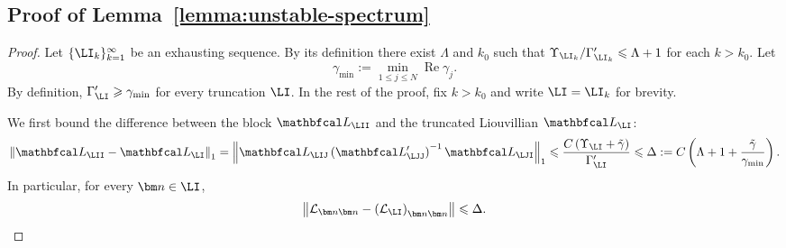 \documentclass{SciPost}
\renewcommand{\Re}{\operatorname{Re}}
\begin{document}
\subsection{Proof of Lemma~\ref{lemma:unstable-spectrum}}
\label{sec:lemma-unstable-spectrum-proof}
\begin{proof}
    Let $\{\LI_k\}_{k=1}^\infty$ be an exhausting sequence. By its definition there exist $\Lambda$ and $k_0$ such that ${\Upsilon_{\LI_k}} / {\Gamma'_{\LI_k}} \leqslant \Lambda + 1$ for each $k > k_0$.
    Let
    \begin{equation}
        \gamma_{\min}
        :=
        \min_{1\leqslant j\leqslant N}\Re \gamma_j.
    \end{equation}
    By definition, \(\Gamma'_\LI \geqslant \gamma_{\min}\) for every truncation \(\LI\).
    In the rest of the proof, fix $k>k_0$ and write $\LI=\LI_k$ for brevity.

    We first bound the difference between the block \(\mathbfcal L_\LII\) and the truncated Liouvillian \(\mathbfcal L_\LI\):
    \begin{equation}
        \left \|
        \mathbfcal L_\LII - 
        \mathbfcal L_\LI
        \right \|_1 = \left \|
        \mathbfcal L_\LIJ
        \left(\mathbfcal L_\LJJ'\right)^{-1}
        \mathbfcal L_\LJI
        \right\|_1 \leqslant
        \frac{C \left(\Upsilon_\LI + \tilde \gamma\right)}{\Gamma_\LI'}  \leqslant
        \Delta := C\left(\Lambda + 1 + \frac{\tilde \gamma}{\gamma_{\min}}\right).
    \end{equation}
    In particular, for every \(\bm n \in \LI\),
    \begin{equation}
        \left\|
        \mathcal L_{\bm n\bm n}
        -
        \left(\mathcal L_\LI\right)_{\bm n\bm n}
        \right\|
        \leqslant
        \Delta.
        \label{eq:diag-diff-delta}
    \end{equation}


\end{proof}
\end{document}
